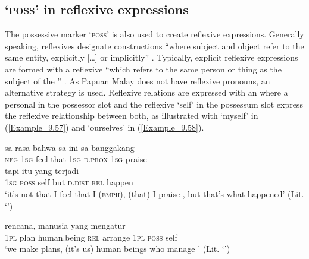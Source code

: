 \subsection{ ‘\textsc{poss}’ in reflexive expressions}
\label{Para_9.3.4}
The possessive marker  ‘\textsc{poss}’ is also used to create reflexive expressions. Generally speaking, reflexives designate constructions “where subject and object refer to the same entity, explicitly [{\ldots}] or implicitly” \citep[5164]{Asher.1994}. Typically, explicit reflexive expressions are formed with a reflexive  “which refers to the same person or thing as the subject of the ” \citep[5165]{Asher.1994}. As Papuan Malay does not have reflexive pronouns, an alternative strategy is used. Reflexive relations are expressed with an  where a personal  in the possessor slot and the reflexive   ‘self’ in the possessum slot express the reflexive relationship between both, as illustrated with  ‘myself’ in (\ref{Example_9.57}) and  ‘ourselves’ in (\ref{Example_9.58}).


\ea
\label{Example_9.57}
 {{sa}} {{rasa}} {{bahwa}} {{sa}} {{ini}} {sa} {banggakang}\\ %
 {\textsc{neg}}  {\textsc{1sg}}  {feel}  {that}  {\textsc{1sg}}  {\textsc{d.prox}}  \textsc{1sg}  praise\\
\gll {}  {}  {}  {tapi}  {itu}  {yang}  {terjadi}\\
 \textsc{1sg}  {\textsc{poss}}  {self}  {but}  {\textsc{d.dist}}  {\textsc{rel}}  {happen}\\
\glt 
‘it’s not that I feel that I (\textsc{emph}), (that) I praise , but that’s what happened’ (Lit. ‘’) \textstyleExampleSource{[081110-008-CvNP.0152]}
\z

\ea
\label{Example_9.58}
 {rencana,} {manusia} {yang} {mengatur} {} {} {}\\ %
 \textsc{1pl}  plan  human.being  \textsc{rel}  arrange  \textsc{1pl}  \textsc{poss}  self\\
\glt
‘we make plans, (it’s us) human beings who manage ’ (Lit. ‘’) \textstyleExampleSource{[080918-001-CvNP.0032]}
\z



